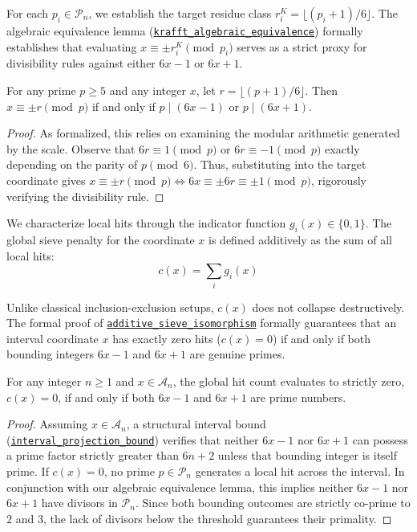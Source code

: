 \documentclass[lean]{AFM}
\renewcommand{\.}{\hskip .75pt}
\def\urlpfx{https://github.com/ElNando888/KrafftSieve/blob/v1.0}
\begin{document}
For each $p_i \in \mathcal{P}_n$, we establish the target residue class
$r^K_i = \lfloor (p_i + 1) / 6 \rfloor$. The algebraic equivalence lemma
(\href{\urlpfx/KrafftSieve/SelbergWeights.lean#L99}{\texttt{krafft\_algebraic\_equivalence}})
formally establishes that evaluating $x \equiv \pm r^K_i \pmod{p_i}$ serves as a strict
proxy for divisibility rules against either $6x-1$ or $6x+1$. 

\begin{lemma}
For any prime $p \ge 5$ and any integer $x$, let $r = \lfloor(p+1)/6\rfloor$. Then
$x \equiv \pm r \pmod{p}$ if and only if $p \mid (6x-1)$ or $p \mid (6x+1)$.
\end{lemma}
\begin{proof}
As formalized, this relies on examining the modular arithmetic generated by the scale. Observe that
$6r \equiv 1 \pmod{p}$ or $6r \equiv -1 \pmod{p}$ exactly depending on the parity of $p \pmod{6}$.
Thus, substituting into the target coordinate gives
$x \equiv \pm r \pmod{p} \iff 6x \equiv \pm 6r \equiv \pm 1 \pmod{p}$, rigorously verifying the
divisibility rule.
\end{proof}

We characterize local hits through the indicator function $g_i(x) \in \{0, 1\}$. The global sieve
penalty for the coordinate $x$ is defined additively as the sum of all local hits:
$$ c(x) = \sum_{i} g_i(x) $$ 

Unlike classical inclusion-exclusion setups, $c(x)$ does not collapse destructively. The formal
proof of \href{\urlpfx/KrafftSieve/SelbergWeights.lean#L329}{\texttt{additive\_sieve\_isomorphism}}
formally guarantees that an interval coordinate $x$ has exactly zero hits ($c(x) = 0$) if and only
if both bounding integers $6x-1$ and $6x+1$ are genuine primes.  

\begin{theorem}
For any integer $n \ge 1$ and $x \in \mathcal{A}_n$, the global hit count evaluates to strictly
zero, $c(x) = 0$, if and only if both $6x-1$ and $6x+1$ are prime numbers.
\end{theorem}
\begin{proof}
Assuming $x \in \mathcal{A}_n$, a structural interval bound
(\href{\urlpfx/KrafftSieve/SelbergWeights.lean#L129}{\texttt{interval\_projection\_bound}})
verifies that neither $6x-1$ nor $6x+1$ can possess a prime factor strictly greater than $6n+2$
unless that bounding integer is itself prime. If $c(x) = 0$, no prime $p \in \mathcal{P}_n$
generates a local hit across the interval. In conjunction with our algebraic equivalence lemma,
this implies neither $6x-1$ nor $6x+1$ have divisors in $\mathcal{P}_n$. Since both bounding
outcomes are strictly co-prime to $2$ and $3$, the lack of divisors below the threshold guarantees
their primality.
\end{proof}
\end{document}
